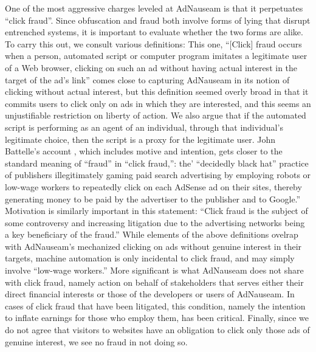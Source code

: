 \documentclass[conference]{IEEEtran}
\begin{document}
One of the most aggressive charges leveled at AdNauseam is that it perpetuates ``click fraud''. Since obfuscation and fraud both involve forms of lying that disrupt entrenched systems, it is important to evaluate whether the two forms are alike.  To carry this out, we consult various definitions: This one,   ``[Click] fraud occurs when a person, automated script or computer program imitates a legitimate user of a Web browser, clicking on such an ad without having actual interest in the target of the ad's link''\cite{Liu} comes close to capturing AdNauseam in its notion of clicking without actual interest, but this definition seemed overly broad in that it commits users to click only on ads in which they are interested, and this seems an unjustifiable restriction on liberty of action. We also argue that if the automated script is performing as an agent of an individual, through that individual's legitimate choice, then the script is a proxy for the legitimate user. John Battelle's account \cite{Battelle}, which includes motive and intention, gets closer to the standard meaning of ``fraud'' in ``click fraud,'': the' ``decidedly black hat'' practice of publishers illegitimately gaming paid search advertising by employing robots or low-wage workers to repeatedly click on each AdSense ad on their sites, thereby generating money to be paid by the advertiser to the publisher and to Google.'' Motivation is similarly important in this statement: ``Click fraud is the subject of some controversy and increasing litigation due to the advertising networks being a key beneficiary of the fraud.'' \cite{ClickFraud}
While elements of the above definitions ovelrap with AdNauseam's mechanized clicking on ads without genuine interest in their targets, machine automation is only incidental to click fraud, and may simply involve ``low-wage workers.'' More significant is what AdNauseam does not share with click fraud, namely action on behalf of stakeholders that serves either their direct financial interests or those of the developers or users of AdNauseam. In cases of click fraud that have been litigated, this condition, namely the intention to inflate earnings for those who employ them, has been critical. Finally, since we do not agree that visitors to websites have an obligation to click only those ads of genuine interest, we see no fraud in not doing so.
\end{document}

